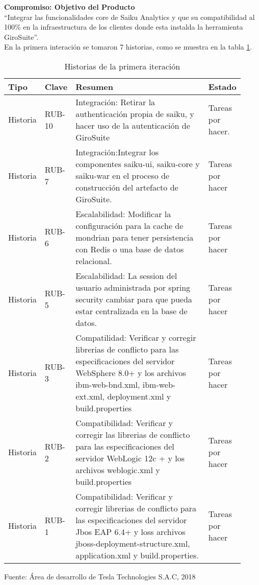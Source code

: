 \begin{spacing}{1.5}
	\textbf{Compromiso: Objetivo del Producto}\\
	``Integrar las funcionalidades core de Saiku Analytics y que su compatibilidad al 100\% en la infraestructura de los clientes donde esta instalda la herramienta GiroSuite''.\\
	En la primera interaci\'{o}n se tomaron 7 historias, como se muestra en la tabla \ref{table:III_1}. 
	\begin{table}[bth]\centering\small
	\begin{tabular}[H]{m{0.1\linewidth}m{0.1\linewidth}|m{0.6\linewidth} m{0.12\linewidth}}
			\hline
			\rowcolor[HTML]{CBCEFB} 
			\textbf{Tipo} & \textbf{Clave} &\textbf{Resumen} &\textbf{Estado}\\
			\hline
			Historia &RUB-10 &Integración: Retirar la authenticación propia de saiku, y hacer uso de la autenticación de GiroSuite &Tareas por hacer.\\
			\hline
			Historia &RUB-7 &Integración:Integrar los componentes saiku-ui, saiku-core y saiku-war en el proceso de construcción del artefacto de GiroSuite. &Tareas por hacer\\
			\hline
			Historia &RUB-6 &Escalabilidad: Modificar la configuración para la cache de mondrian para tener persistencia con Redis o una base de datos relacional. &Tareas por hacer\\
			\hline
			Historia &RUB-5 &Escalabilidad: La session del usuario administrada por spring security cambiar para que pueda estar centralizada en la base de datos. &Tareas por hacer\\
			\hline
			Historia &RUB-3 &Compatilidad: Verificar y corregir librerias de conflicto para las especificaciones del servidor WebSphere 8.0+ y los archivos ibm-web-bnd.xml, ibm-web-ext.xml, deployment.xml y build.properties &Tareas por hacer\\
			\hline
			Historia &RUB-2 &Compatibilidad: Verificar y corregir las librerias de conflicto para las especificaciones del servidor WebLogic 12c + y los archivos weblogic.xml y build.properties &Tareas por hacer\\
			\hline
			Historia &RUB-1 &Compatibilidad: Verificar y corregir librerias de conflicto para las especificaciones del servidor Jbos EAP 6.4+ y loss archivos jboss-deployment-structure.xml, application.xml y build.properties. &Tareas por hacer\\
			\hline
		\end{tabular}
	\caption{Historias de la primera iteraci\'{o}n}
	\small {Fuente: \'{A}rea de desarrollo de Tesla Technologies S.A.C, 2018}
	\label{table:III_1}
	\end{table}


\end{spacing}
